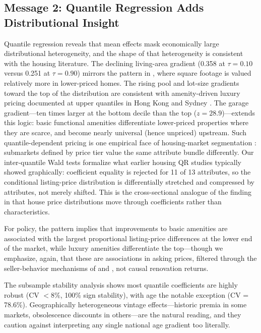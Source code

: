 \subsection{Message 2: Quantile Regression Adds Distributional Insight}

Quantile regression reveals that mean effects mask economically large
distributional heterogeneity, and the shape of that heterogeneity is consistent
with the housing literature. The declining living-area gradient (0.358 at
$\tau = 0.10$ versus 0.251 at $\tau = 0.90$) mirrors the pattern in
\citet{zietz2008determinants}, where square footage is valued relatively more in
lower-priced homes. The rising pool and lot-size gradients toward the top of the
distribution are consistent with amenity-driven luxury pricing documented at upper
quantiles in Hong Kong \citep{mak2010quantile} and Sydney \citep{waltl2019variation}.
The garage gradient---ten times larger at the bottom decile than the top
($z = 28.9$)---extends this logic: basic functional amenities differentiate
lower-priced properties where they are scarce, and become nearly universal (hence
unpriced) upstream. Such quantile-dependent pricing is one empirical face of
housing-market segmentation \citep{goodman1998andrew}: submarkets defined by
price tier value the same attribute bundle differently. Our inter-quantile Wald tests formalize what earlier housing
QR studies typically showed graphically: coefficient equality is rejected for 11
of 13 attributes, so the conditional listing-price distribution is differentially
stretched and compressed by attributes, not merely shifted. This is the
cross-sectional analogue of the finding in \citet{mcmillen2008changes} that house
price distributions move through coefficients rather than characteristics.

For policy, the pattern implies that improvements to basic amenities are
associated with the largest proportional listing-price differences at the lower
end of the market, while luxury amenities differentiate the top---though we
emphasize, again, that these are associations in asking prices, filtered through
the seller-behavior mechanisms of \citet{genesove2001loss} and \citet{han2016role},
not causal renovation returns.

The subsample stability analysis shows most quantile coefficients are highly
robust (CV $< 8\%$, 100\% sign stability), with age the notable exception
(CV = 78.6\%). Geographically heterogeneous vintage effects---historic premia in
some markets, obsolescence discounts in others---are the natural reading, and they
caution against interpreting any single national age gradient too literally.

